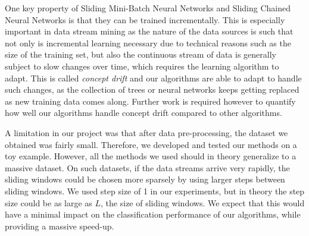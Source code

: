 \documentclass[conference]{IEEEtran}
\begin{document}
		
		One key property of   Sliding Mini-Batch Neural Networks and Sliding Chained Neural Networks is that they can be trained incrementally. This is especially important in data stream mining as the nature of the data sources is such that not only is incremental learning necessary due to technical reasons such as the size of the training set, but also the continuous stream of data is generally subject to slow changes over time, which requires the learning algorithm to adapt. This is called \emph{concept drift} and our algorithms are able to adapt to handle such changes, as the collection of trees or neural networks keeps getting replaced as new training data comes along. Further work is required however to quantify how well our algorithms handle concept drift compared to other algorithms.
		
		A limitation in our project was that after data pre-processing, the dataset we obtained was fairly small. Therefore, we developed and tested our methods on a toy example. However, all the methods we used should in theory generalize to a massive dataset. On such datasets, if the data streams arrive very rapidly, the sliding windows could be chosen more sparsely by using larger steps between sliding windows. We used step size of 1 in our experiments, but in theory the step size could be as large as $L$, the size of sliding windows. We expect that this would have a minimal impact on the classification performance of our algorithms, while providing a massive speed-up.
		
		
		
\end{document}
